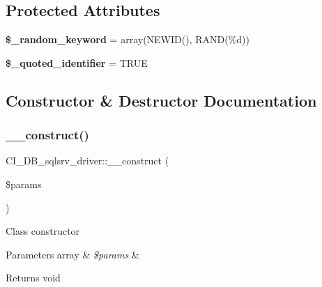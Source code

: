 \subsection*{Protected Attributes}
\begin{DoxyCompactItemize}
\item 
\mbox{\label{class_c_i___d_b__sqlsrv__driver_a37f621165b06739d086e4d79e4f1ff9a}} 
{\bfseries \$\+\_\+random\+\_\+keyword} = array(\textquotesingle{}N\+E\+W\+ID()\textquotesingle{}, \textquotesingle{}R\+A\+ND(\%d)\textquotesingle{})
\item 
\mbox{\label{class_c_i___d_b__sqlsrv__driver_ad37fd325ab6943f084fd9683a1e95cb3}} 
{\bfseries \$\+\_\+quoted\+\_\+identifier} = T\+R\+UE
\end{DoxyCompactItemize}


\subsection{Constructor \& Destructor Documentation}
\mbox{\label{class_c_i___d_b__sqlsrv__driver_ac5b1b6bd430f7f1dc1b9660a61a2934b}} 
\subsubsection{\texorpdfstring{\+\_\+\+\_\+construct()}{\_\_construct()}}
{\footnotesize\ttfamily C\+I\+\_\+\+D\+B\+\_\+sqlsrv\+\_\+driver\+::\+\_\+\+\_\+construct (\begin{DoxyParamCaption}\item[{}]{\$params }\end{DoxyParamCaption})}

Class constructor


\begin{DoxyParams}[1]{Parameters}
array & {\em \$params} & \\
\hline
\end{DoxyParams}
\begin{DoxyReturn}{Returns}
void 
\end{DoxyReturn}


